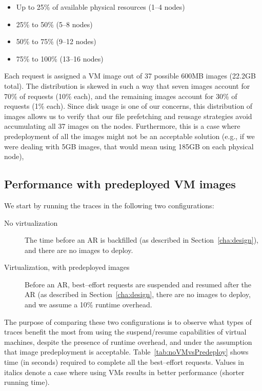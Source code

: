 \begin{description}
\begin{itemize}
\item Up to 25\% of available physical resources (1--4 nodes)
\item 25\% to 50\% (5--8 nodes)
\item 50\% to 75\% (9--12 nodes)
\item 75\% to 100\% (13--16 nodes)
\end{itemize}
\end{description}

Each request is assigned a VM image out of 37 possible 600MB images (22.2GB total). The distribution is skewed in such a way that seven images account for 70\% of requests (10\% each), and the remaining images account for 30\% of requests (1\% each). Since disk usage is one of our concerns, this distribution of images allows us to verify that our file prefetching and reusage strategies avoid accumulating all 37 images on the nodes. Furthermore, this is a case where predeployment of all the images might not be an acceptable solution (e.g., if we were dealing with 5GB images, that would mean using 185GB on each physical node), 

\subsection{Performance with predeployed VM images}

We start by running the traces in the following two configurations:

\begin{description}
\item[No virtualization] The time before an AR is backfilled (as described in Section~\ref{cha:design}), and there are no images to deploy.
\item[Virtualization, with predeployed images] Before an AR, best--effort requests are suspended and resumed after the AR (as described in Section~\ref{cha:design}, there are no images to deploy, and we assume a 10\% runtime overhead.
\end{description}

The purpose of comparing these two configurations is to observe what types of traces benefit the most from using the suspend/resume capabilities of virtual machines, despite the presence of runtime overhead, and under the assumption that image predeployment is acceptable. Table~\ref{tab:noVMvsPredeploy} shows time (in seconds) required to complete all the best--effort requests. Values in italics denote a case where using VMs results in better performance (shorter running time).

